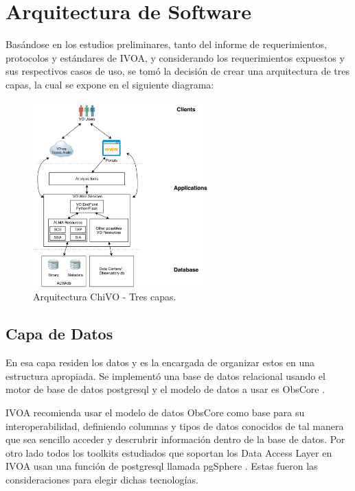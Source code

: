 \section{Arquitectura de Software}

Basándose en los estudios preliminares, tanto del informe de requerimientos,
protocolos y estándares de IVOA, y considerando los requerimientos expuestos y
sus respectivos casos de uso, se tomó la decisión de crear una arquitectura de
tres capas, la cual se expone en el siguiente diagrama:
\vspace{1.0cm}
\begin{figure}[h!t]
    \begin{center}
        \includegraphics[width=0.6\textwidth]{img/chivo_capas.png}
        \caption{Arquitectura ChiVO - Tres capas.}
    \end{center}
\end{figure}

\subsection{Capa de Datos}
En esa capa residen los datos y es la encargada de organizar estos en una
estructura apropiada. Se implementó una base de datos relacional usando el
motor de base de datos postgresql \cite{psql} y el modelo de datos a usar es
ObsCore \cite{obscore}.

IVOA recomienda usar el modelo de datos ObsCore como base para su
interoperabilidad, definiendo columnas y tipos de datos conocidos de tal manera
que sea sencillo acceder y descrubrir información dentro de la base de datos.
Por otro lado todos los toolkits estudiados que soportan los Data Access Layer
en IVOA usan una función de postgresql llamada pgSphere \cite{pgsphere}. Estas
fueron las consideraciones para elegir dichas tecnologías.

